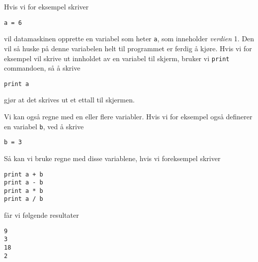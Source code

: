 \documentclass[a4paper, 11pt, notitlepage]{article}
\begin{document}
Hvis vi for eksempel skriver
\begin{lstlisting}
a = 6
\end{lstlisting}
\vspace{-0.3cm}
vil datamaskinen opprette en variabel som heter \verb+a+, som inneholder \emph{verdien} 1. Den vil så huske på denne variabelen helt til programmet er ferdig å kjøre. Hvis vi for eksempel vil skrive ut innholdet av en variabel til skjerm, bruker vi \verb+print+ commandoen, så å skrive
\begin{lstlisting}
print a
\end{lstlisting}
\vspace{-0.3cm}
gjør at det skrives ut et ettall til skjermen.

Vi kan også regne med en eller flere variabler. Hvis vi for eksempel også definerer en variabel \verb+b+, ved å skrive
\begin{lstlisting}
b = 3
\end{lstlisting}
\vspace{-0.3cm}
Så kan vi bruke regne med disse variablene, hvis vi foreksempel skriver
\begin{lstlisting}
print a + b
print a - b
print a * b
print a / b
\end{lstlisting}
\vspace{-0.3cm}
får vi følgende resultater
\begin{lstlisting}
9
3
18
2
\end{lstlisting}
\vspace{-0.3cm}
\end{document}
